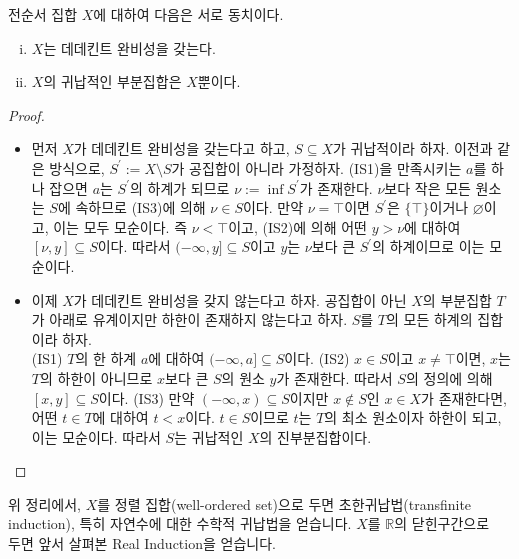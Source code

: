 \documentclass[serif]{beamer}
\begin{document}
\begin{frame}{}
    \begin{thm*}{}
        전순서 집합 $X$에 대하여 다음은 서로 동치이다.
        \begin{enumerate}[(i)]
            \item $X$는 데데킨트 완비성을 갖는다.
            \item $X$의 귀납적인 부분집합은 $X$뿐이다.
        \end{enumerate}
    \end{thm*}
    \begin{proof}
        \begin{itemize}
            \item[($\Rightarrow$)] 먼저 $X$가 데데킨트 완비성을 갖는다고 하고, $S\subseteq X$가 귀납적이라 하자.
                이전과 같은 방식으로, $S^\prime:=X\setminus S$가 공집합이 아니라 가정하자.
                (IS1)을 만족시키는 $a$를 하나 잡으면 $a$는 $S^\prime$의 하계가 되므로 $\nu:=\inf S^\prime$가 존재한다.
                $\nu$보다 작은 모든 원소는 $S$에 속하므로 (IS3)에 의해 $\nu\in S$이다.
                만약 $\nu=\top$이면 $S^\prime$은 $\{\top\}$이거나 $\varnothing$이고, 이는 모두 모순이다.
                즉 $\nu<\top$이고, (IS2)에 의해 어떤 $y>\nu$에 대하여 $[\nu,y]\subseteq S$이다.
                따라서 $(-\infty,y]\subseteq S$이고 $y$는 $\nu$보다 큰 $S^\prime$의 하계이므로 이는 모순이다.
            \item[($\Leftarrow$)] 이제 $X$가 데데킨트 완비성을 갖지 않는다고 하자.
                공집합이 아닌 $X$의 부분집합 $T$가 아래로 유계이지만 하한이 존재하지 않는다고 하자.
                $S$를 $T$의 모든 하계의 집합이라 하자. \\
                (IS1) $T$의 한 하계 $a$에 대하여 $(-\infty,a]\subseteq S$이다.
                (IS2) $x\in S$이고 $x\ne\top$이면, $x$는 $T$의 하한이 아니므로 $x$보다 큰 $S$의 원소 $y$가 존재한다.
                따라서 $S$의 정의에 의해 $[x,y]\subseteq S$이다.
                (IS3) 만약 $(-\infty,x)\subseteq S$이지만 $x\notin S$인 $x\in X$가 존재한다면, 어떤 $t\in T$에 대하여 $t<x$이다.
                $t\in S$이므로 $t$는 $T$의 최소 원소이자 하한이 되고, 이는 모순이다.
                따라서 $S$는 귀납적인 $X$의 진부분집합이다.\qedhere
        \end{itemize}
    \end{proof}
    위 정리에서, $X$를 정렬 집합(well-ordered set)으로 두면 초한귀납법(transfinite induction), 특히 자연수에 대한 수학적 귀납법을 얻습니다.
    $X$를 $\mathbb R$의 닫힌구간으로 \\ 두면 앞서 살펴본 Real Induction을 얻습니다.
\end{frame}
\end{document}
